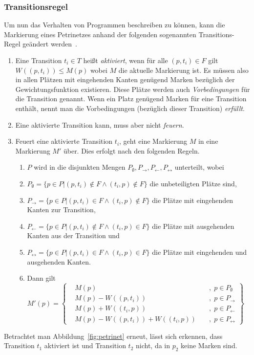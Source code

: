 \subsubsection{Transitionsregel} Um nun das Verhalten von Programmen beschreiben zu können, kann die Markierung eines Petrinetzes anhand der folgenden sogenannten Transitions-Regel geändert werden~\cite{Murata1989}.
\begin{enumerate}
	\item Eine Transition $t_i \in T$ heißt \emph{aktiviert}, wenn für alle $(p,t_i) \in F $ gilt $ W((p,t_i)) \leq M(p)$ wobei $M$ die aktuelle Markierung ist. Es müssen also in allen Plätzen mit eingehenden Kanten genügend Marken bezüglich der Gewichtungsfunktion existieren. Diese Plätze werden auch \emph{Vorbedingungen} für die Transition genannt. Wenn ein Platz genügend Marken für eine Transition enthält, nennt man die Vorbedingungen (bezüglich dieser Transition) \emph{erfüllt}.
	\item Eine aktivierte Transition kann, muss aber nicht \emph{feuern}.
	\item Feuert eine aktivierte Transition $t_i$, geht eine Markierung $M$ in eine Markierung $M'$ über. Dies erfolgt nach den folgenden Regeln.
	\begin{enumerate}
		\item $P$ wird in die disjunkten Mengen $P_\emptyset, P_\rightarrow, P_\leftarrow, P_\leftrightarrow$ unterteilt, wobei 
		\item $P_\emptyset = \{p \in P | (p,t_i) \notin F \land (t_i,p) \notin F\}$ die unbeteiligten Plätze sind,
		\item $P_\rightarrow = \{p \in P | (p,t_i) \in F \land (t_i,p) \notin F\}$ die Plätze mit eingehenden Kanten zur Transition,
		\item $P_\leftarrow = \{p \in P | (p,t_i) \notin F \land (t_i,p) \in F\}$ die Plätze mit ausgehenden Kanten aus der Transition und 
		\item $P_\leftrightarrow = \{p \in P | (p,t_i) \in F \land (t_i,p) \in F\}$ die Plätze mit eingehenden und ausgehenden Kanten.
		\item Dann gilt $
			M'(p) = \left\{ 
				\begin{aligned}
					& M(p) && \; , \; p \in P_\emptyset\\
					& M(p)-W((p,t_i)) && \; , \; p \in P_\rightarrow\\
					&M(p)+W((t_i,p)) && \; , \; p \in P_\leftarrow\\
					& M(p)-W((p,t_i))+W((t_i,p)) && \; , \; p \in P_\leftrightarrow
				\end{aligned}
				\right\}
		$
	\end{enumerate}
\end{enumerate}
Betrachtet man Abbildung~\vref{fig:petrinet} erneut, lässt sich erkennen, dass Transition $t_1$ aktiviert ist und Transition $t_2$ nicht, da in $p_2$ keine Marken sind.

